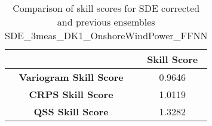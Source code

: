 
        \begin{table}[h!]
            \centering
            \begin{tabular}{|c|c|}
                \hline
                & \textbf{Skill Score}  \\
                \hline
                \textbf{Variogram Skill Score} & 0.9646  \\
                \hline
                \textbf{CRPS Skill Score} & 1.0119  \\
                \hline
                \textbf{QSS Skill Score} & 1.3282 \\
                \hline
            \end{tabular}
            \caption{Comparison of skill scores for SDE corrected and previous ensembles SDE_3meas_DK1_OnshoreWindPower_FFNN}
            \label{table:skill_scores_comparison}
        \end{table}
        